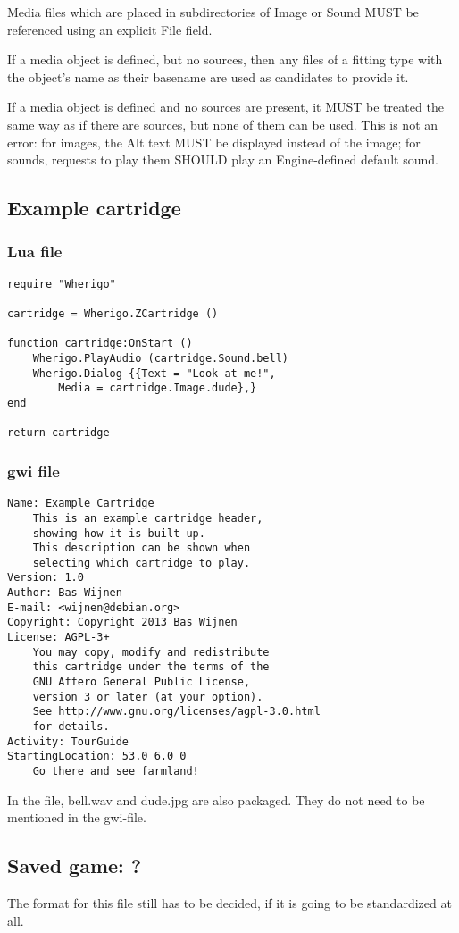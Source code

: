 \documentclass{article}
\begin{document}
Media files which are placed in subdirectories of Image or Sound MUST be
referenced using an explicit File field.

If a media object is defined, but no sources, then any files of a fitting type
with the object's name as their basename are used as candidates to provide it.

If a media object is defined and no sources are present, it MUST be treated the
same way as if there are sources, but none of them can be used. This is not an
error: for images, the Alt text MUST be displayed instead of the image; for
sounds, requests to play them SHOULD play an Engine-defined default sound.

\subsection{Example cartridge}
\subsubsection{Lua file}
\noindent\begin{lstlisting}
require "Wherigo"

cartridge = Wherigo.ZCartridge ()

function cartridge:OnStart ()
	Wherigo.PlayAudio (cartridge.Sound.bell)
	Wherigo.Dialog {{Text = "Look at me!",
		Media = cartridge.Image.dude},}
end

return cartridge
\end{lstlisting}
\subsubsection{gwi file}
\noindent\begin{lstlisting}
Name: Example Cartridge
	This is an example cartridge header,
	showing how it is built up.
	This description can be shown when
	selecting which cartridge to play.
Version: 1.0
Author: Bas Wijnen
E-mail: <wijnen@debian.org>
Copyright: Copyright 2013 Bas Wijnen
License: AGPL-3+
	You may copy, modify and redistribute
	this cartridge under the terms of the
	GNU Affero General Public License,
	version 3 or later (at your option).
	See http://www.gnu.org/licenses/agpl-3.0.html
	for details.
Activity: TourGuide
StartingLocation: 53.0 6.0 0
	Go there and see farmland!
\end{lstlisting}

In the file, bell.wav and dude.jpg are also packaged. They do not need to be
mentioned in the gwi-file.

\subsection{Saved game: ?}
The format for this file still has to be decided, if it is going to be
standardized at all.
\end{document}
